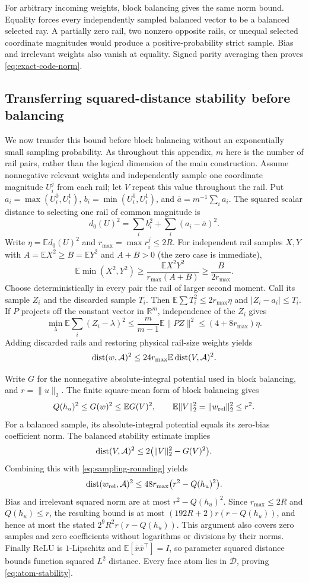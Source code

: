 \documentclass[11pt]{article}
\theoremstyle{remark}\newtheorem{remark}[theorem]{Remark}
\newcommand{\R}{\mathbb R}\newcommand{\E}{\mathbb E}\newcommand{\Prb}{\mathbb P}
\begin{document}
For arbitrary incoming weights, block balancing gives the same norm
bound. Equality forces every independently sampled balanced vector to
be a balanced selected ray. A partially zero rail, two nonzero opposite
rails, or unequal selected coordinate magnitudes would produce a
positive-probability strict sample. Bias and irrelevant weights also
vanish at equality. Signed parity averaging then proves
\eqref{eq:exact-code-norm}.

\subsection{Transferring squared-distance stability before balancing}

We now transfer this bound before block balancing without an exponentially
small sampling probability. As throughout this appendix, $m$ here is the
number of rail pairs, rather than the logical dimension of the main construction.
Assume nonnegative relevant weights and
independently sample one coordinate magnitude $U_i^j$ from each rail;
let $V$ repeat this value throughout the rail. Put
$a_i=\max(U_i^0,U_i^1)$, $b_i=\min(U_i^0,U_i^1)$, and
$\bar a=m^{-1}\sum_i a_i$. The squared scalar distance to selecting one
rail of common magnitude is
\[
 d_0(U)^2=\sum_i b_i^2+\sum_i(a_i-\bar a)^2.
\]
Write $\eta=\E d_0(U)^2$ and $r_{\max}=\max r_i^j\le2R$.
For independent rail samples $X,Y$ with $A=\E X^2\ge B=\E Y^2$
and $A+B>0$ (the zero case is immediate),
\[
 \E\min(X^2,Y^2)
 \ge\frac{\E X^2Y^2}{r_{\max}(A+B)}
 \ge\frac{B}{2r_{\max}}.
\]
Choose deterministically in every pair the rail of larger second moment.
Call its sample $Z_i$ and the discarded sample $T_i$. Then
$\E\sum T_i^2\le2r_{\max}\eta$ and $|Z_i-a_i|\le T_i$.
If $P$ projects off the constant vector in $\R^m$, independence of the
$Z_i$ gives
\[
 \min_\lambda\E\sum_i(Z_i-\lambda)^2
 \le\frac{m}{m-1}\E\|PZ\|^2
 \le(4+8r_{\max})\eta.
\]
Adding discarded rails and restoring physical rail-size weights yields
\begin{equation}\label{eq:sampling-rounding}
 \dist(w,\mathcal A)^2\le24r_{\max}\E\dist(V,\mathcal A)^2.
\end{equation}

Write $G$ for the nonnegative absolute-integral potential used in
block balancing, and $r=\|u\|_2$. The finite square-mean form of block
balancing gives
\[
 Q(h_u)^2\le G(w)^2\le\E G(V)^2,
 \qquad \E\|V\|_2^2=\|w_{\rm rel}\|_2^2\le r^2.
\]
For a balanced sample, its absolute-integral potential equals its
zero-bias coefficient norm. The balanced stability estimate implies
\[
 \operatorname{dist}(V,\mathcal A)^2
 \le2\bigl(\|V\|_2^2-G(V)^2\bigr).
\]
Combining this with \eqref{eq:sampling-rounding} yields
\[
 \operatorname{dist}(w_{\rm rel},\mathcal A)^2
 \le48r_{\max}\bigl(r^2-Q(h_u)^2\bigr).
\]
Bias and irrelevant squared norm are at most $r^2-Q(h_u)^2$.
Since $r_{\max}\le2R$ and $Q(h_u)\le r$, the resulting bound is at
most $(192R+2)r(r-Q(h_u))$, and hence at most the stated
$2^9R^2r(r-Q(h_u))$. This argument also covers zero samples and zero
coefficients without logarithms or divisions by their norms.
Finally ReLU is
$1$-Lipschitz and $\E[\bar x\bar x^\top]=I$, so parameter squared
distance bounds function squared $L^2$ distance. Every face atom lies in
$\mathcal D$, proving \eqref{eq:atom-stability}.
\end{document}
